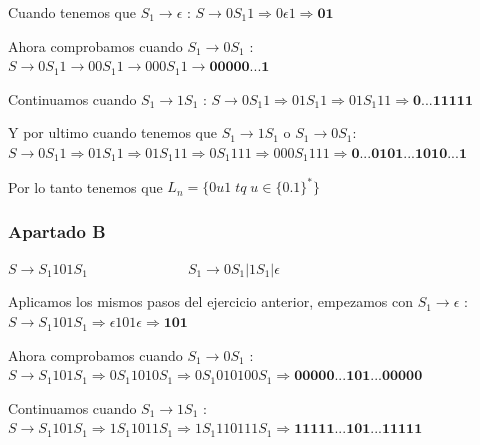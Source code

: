 Cuando tenemos que $ S_{1} \rightarrow \epsilon $ : \newline
$ S \rightarrow 0 S_{1} 1 \Rightarrow 0 \epsilon 1 \Rightarrow \textbf{01} $ \newline

Ahora comprobamos cuando $ S_{1} \rightarrow 0S_{1} $ : \newline
$ S \rightarrow 0 S_{1} 1 \rightarrow 0 0 S_{1} 1 \rightarrow 0 0 0 S_{1} 1 \rightarrow \textbf{00000...1} $ \newline

Continuamos cuando $ S_{1} \rightarrow 1S_{1} $ : \newline
$ S \rightarrow 0 S_{1} 1 \Rightarrow 0 1S_{1}  1 \Rightarrow 0 1S_{1}  1 1 \Rightarrow \textbf{0...11111} $ \newline

Y por ultimo cuando tenemos que $ S_{1} \rightarrow 1S_{1} $ o $ S_{1} \rightarrow 0S_{1} $: \newline
$ S \rightarrow 0 S_{1} 1 \Rightarrow 0 1S_{1}  1 \Rightarrow 0 1S_{1}  1 1  \Rightarrow 0 S_{1} 1 1 1 \Rightarrow 0 0 0 S_{1} 1 1 1 \Rightarrow \textbf{0...0101...1010...1} $ \newline

Por lo tanto tenemos que $ L_{n}=\{0u1 \; tq \; u \in \{0.1\}^{*} \} $

\subsubsection{Apartado B} 

\textit{$ S \rightarrow S_{1} 101 S_{1} \hspace{3cm} S_{1} \rightarrow 0S_{1} | 1S_{1} | \epsilon $ }\newline

Aplicamos los mismos pasos del ejercicio anterior, empezamos con $ S_{1} \rightarrow \epsilon $ : \newline
$ S \rightarrow S_{1} 1 0 1 S_{1} \Rightarrow \epsilon 1 0 1 \epsilon \Rightarrow \textbf{101} $ \newline

Ahora comprobamos cuando $ S_{1} \rightarrow 0S_{1} $ : \newline
$ S \rightarrow S_{1} 1 0 1 S_{1} \Rightarrow 0S_{1} 1 0 1 0S_{1} \Rightarrow 0S_{1} 0 1 0 1 0 0S_{1} \Rightarrow \textbf{00000...101...00000} $ \newline

Continuamos cuando $ S_{1} \rightarrow 1S_{1} $ : \newline
$ S \rightarrow S_{1} 1 0 1 S_{1} \Rightarrow 1S_{1} 1 0 1 1S_{1} \Rightarrow 1S_{1} 1 1 0 1 1 1S_{1} \Rightarrow \textbf{11111...101...11111} $ \newline

